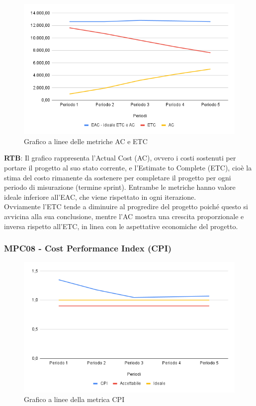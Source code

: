 \documentclass[10pt]{article}
\begin{document}
\begin{justify}
\begin{figure}[H]
  \centering
  \includegraphics[width=0.9\linewidth]{AC-ETC.png}
  \caption{Grafico a linee delle metriche AC e ETC}
  \label{fig:AC-ETCchart}
\end{figure}

\textbf{RTB}: Il grafico rappresenta l'Actual Cost (AC), ovvero i costi sostenuti per portare il progetto al suo stato corrente, e l'Estimate to Complete (ETC), 
cioè la stima del costo rimanente da sostenere per completare il progetto per ogni periodo di misurazione (termine sprint). Entrambe le metriche hanno valore ideale
inferiore all'EAC, che viene rispettato in ogni iterazione.\\
Ovviamente l'ETC tende a diminuire al progredire del progetto poiché questo si avvicina alla sua conclusione, mentre l'AC mostra una crescita proporzionale e inversa 
rispetto all'ETC, in linea con le aspettative economiche del progetto.

\subsubsection{MPC08 - Cost Performance Index (CPI)}

\begin{figure}[H]
  \centering
  \includegraphics[width=0.9\linewidth]{CPI.png}
  \caption{Grafico a linee della metrica CPI}
  \label{fig:CPIchart}
\end{figure}


\end{justify}
\end{document}
